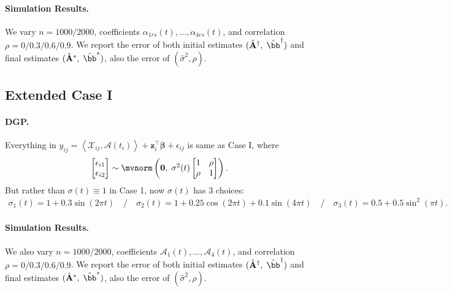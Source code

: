 \documentclass[10pt]{notes}
\begin{document}
\paragraph{Simulation Results.} We vary $n=1000/2000$, coefficients $\alpha_{1rs}(t),\dots,\alpha_{4rs}(t)$, and correlation $\rho=0/0.3/0.6/0.9$. We report the error of both initial estimates $(\hat{\mathbf{A}}^\dagger,\;\hat{\bb}^\dagger)$ and final estimates $(\hat{\mathbf{A}}^*,\;\hat{\bb}^*)$, also the error of $(\hat{\sigma}^2, \hat{\rho})$.



\subsection{Extended Case I}
\paragraph*{DGP.}
Everything in $y_{ij}= \left\langle \mathcal{X}_{ij}, \mathcal{A}(t_i) \right\rangle
   + \mathbf{z}_i^\top \boldsymbol{\beta}
   + \epsilon_{ij}$ 
is same as Case I, where 
\begin{align*}
    \begin{bmatrix}
        \epsilon_{i1}\\ \epsilon_{i2}
    \end{bmatrix}\sim 
    \mvnorm\begin{pmatrix}
        \mathbf{0},\; \sigma^2(t)\begin{bmatrix}
            1 & \rho\\ 
            \rho & 1
        \end{bmatrix}
    \end{pmatrix}.
\end{align*}
But rather than $\sigma(t)\equiv 1$ in Case 1, now $\sigma(t)$ has 3 choices:
\begin{align*}
    \sigma_1(t)=1+0.3\sin(2\pi t)\quad / \quad
    \sigma_2(t) = 1+0.25 \cos(2\pi t)+0.1 \sin(4\pi t)\quad / \quad
    \sigma_3(t) = 0.5+0.5\sin^2(\pi t).
\end{align*}

\paragraph{Simulation Results.} We also vary $n=1000/2000$, coefficients $\mathcal{A}_1(t),\dots,\mathcal{A}_4(t)$, and correlation $\rho=0/0.3/0.6/0.9$. We report the error of both initial estimates $(\hat{\mathbf{A}}^\dagger,\;\hat{\bb}^\dagger)$ and final estimates $(\hat{\mathbf{A}}^*,\;\hat{\bb}^*)$, also the error of $(\hat{\sigma}^2, \hat{\rho})$.
\end{document}
